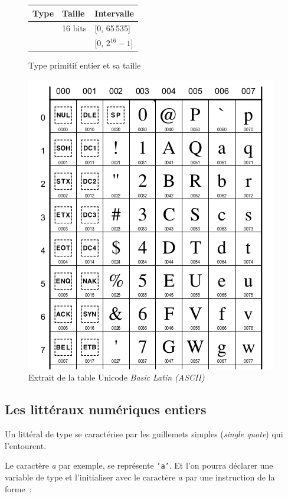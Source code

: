 \begin{figure}[h]
	\centering
	\begin{tabular}[h]{|l|l|p{9cm}|}
		\hline
		\rowcolor{black!20}
		\textbf{Type}	&	\textbf{Taille}	&	\textbf{Intervalle}	\\
		\hline
		\pc{char}	&	16 bits	&	[0, 65\,535]\\
		&			&	[$0$, $2^{16}-1$]\\
		\hline
	\end{tabular}	
	\caption{Type primitif entier  et sa taille}
	\label{fig:typeschar}
\end{figure}

\begin{figure}[t]
	\centering
	\includegraphics[width=.75\linewidth]{../images/unicode-latin.png}
	\caption{Extrait de la table Unicode \textit{Basic Latin (ASCII)}}
	\label{fig:tableunicode}
\end{figure}

\subsection{Les littéraux numériques entiers }

Un littéral de type  se caractérise par les guillemets simples
(\textit{single quote}) qui l'entourent. 

Le caractère \textit{a} par exemple, se représente \texttt{'a'}. Et l'on pourra
déclarer une variable de type  et l'initialiser avec le caractère
\textit{a} par une instruction de la forme~:

